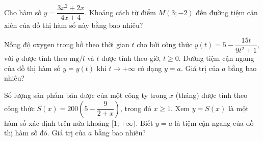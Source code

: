 \begin{ex}
 Cho hàm số $y=\dfrac{3x^2+2x}{4x+4}$. Khoảng cách từ điểm $M(3;-2)$ đến đường tiệm cận xiên của đồ thị hàm số này bằng bao nhiêu?\\
\end{ex}
\begin{ex}
 Nồng độ oxygen trong hồ theo thời gian $t$ cho bởi công thức $y(t)=5-\dfrac{15 t}{9 t^2+1}$, với $y$ được tính theo $\mathrm{mg} / l$ và $t$ được tính theo giờ, $t \geq 0$. Đường tiệm cận ngang của đồ thị hàm số $y=y(t)$ khi $t \to +\infty$ có dạng $y=a$. Giá trị của $a$ bằng bao nhiêu?\\
\end{ex}
\begin{ex}
 Số lượng sản phẩm bán được của một công ty trong $x$ (tháng) được tính theo công thức $S(x)=200\left(5-\dfrac{9}{2+x}\right)$, trong đó $x \geq 1$. Xem $y=S(x)$ là một hàm số xác định trên nửa khoảng $[1 ;+\infty)$. Biết $y=a$ là tiệm cận ngang của đồ thị hàm số đó. Giá trị của $a$ bằng bao nhiêu?\\
\end{ex}

